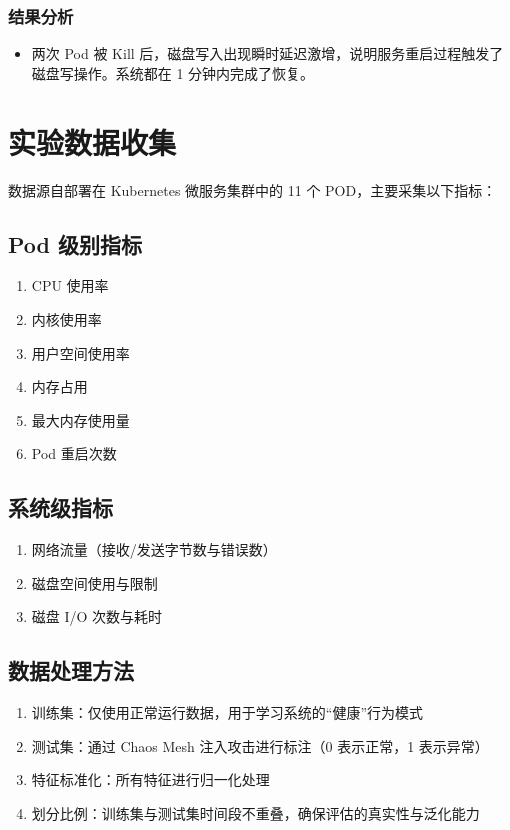 \documentclass[hyperref,a4paper,UTF8]{ctexart}
\begin{document}
\subsubsection{结果分析}
\begin{itemize}
    \item 两次 Pod 被 Kill 后，磁盘写入出现瞬时延迟激增，说明服务重启过程触发了磁盘写操作。系统都在 1 分钟内完成了恢复。
\end{itemize}

\section{实验数据收集}
数据源自部署在 Kubernetes 微服务集群中的 11 个 POD，主要采集以下指标：
\subsection{Pod 级别指标}
\begin{enumerate}
    \item CPU 使用率
    \item 内核使用率
    \item 用户空间使用率
    \item 内存占用
    \item 最大内存使用量
    \item Pod 重启次数
\end{enumerate}

\subsection{系统级指标}
\begin{enumerate}
    \item 网络流量（接收/发送字节数与错误数）
    \item 磁盘空间使用与限制
    \item 磁盘 I/O 次数与耗时
\end{enumerate}

\subsection{数据处理方法}
\begin{enumerate}
    \item 训练集：仅使用正常运行数据，用于学习系统的“健康”行为模式
    \item 测试集：通过 Chaos Mesh 注入攻击进行标注（0 表示正常，1 表示异常）
    \item 特征标准化：所有特征进行归一化处理
    \item 划分比例：训练集与测试集时间段不重叠，确保评估的真实性与泛化能力
\end{enumerate}
\end{document}
